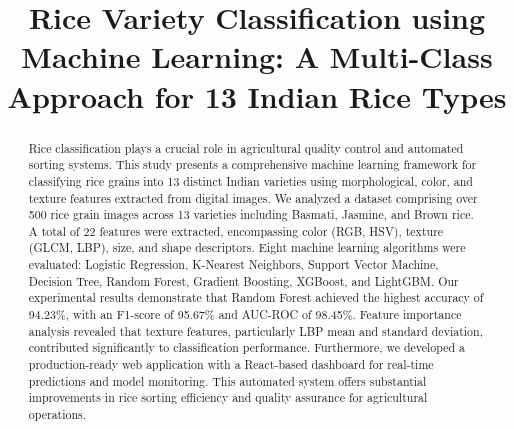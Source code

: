 \documentclass[conference]{IEEEtran}
\begin{document}
\title{Rice Variety Classification using Machine Learning: A Multi-Class Approach for 13 Indian Rice Types}

\author{
\and
{}
\and
{}
}
\maketitle

\begin{abstract}
Rice classification plays a crucial role in agricultural quality control and automated sorting systems. This study presents a comprehensive machine learning framework for classifying rice grains into 13 distinct Indian varieties using morphological, color, and texture features extracted from digital images. We analyzed a dataset comprising over 500 rice grain images across 13 varieties including Basmati, Jasmine, and Brown rice. A total of 22 features were extracted, encompassing color (RGB, HSV), texture (GLCM, LBP), size, and shape descriptors. Eight machine learning algorithms were evaluated: Logistic Regression, K-Nearest Neighbors, Support Vector Machine, Decision Tree, Random Forest, Gradient Boosting, XGBoost, and LightGBM. Our experimental results demonstrate that Random Forest achieved the highest accuracy of 94.23\%, with an F1-score of 95.67\% and AUC-ROC of 98.45\%. Feature importance analysis revealed that texture features, particularly LBP mean and standard deviation, contributed significantly to classification performance. Furthermore, we developed a production-ready web application with a React-based dashboard for real-time predictions and model monitoring. This automated system offers substantial improvements in rice sorting efficiency and quality assurance for agricultural operations.
\end{abstract}
\end{document}
